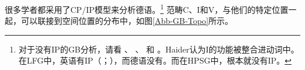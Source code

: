 很多学者都采用了CP/IP模型来分析德语。\footnote{%
对于没有IP的GB分析，请看 、 、 和 。Haider认为I的功能被整合进动词中。在LFG中，英语有IP（\citealp[\S~6.2]{Bresnan2001a}；\citealp[\S~3.2.1]{Dalrymple2001a-u}），而德语没有\citep[\S~3.2.3.2]{Berman2003a}。而在HPSG中，根本就没有IP。
} 
范畴C、I和V，与他们的特定位置一起，可以联接到空间位置的分布中，如图\vref{Abb-GB-Topo}所示。

